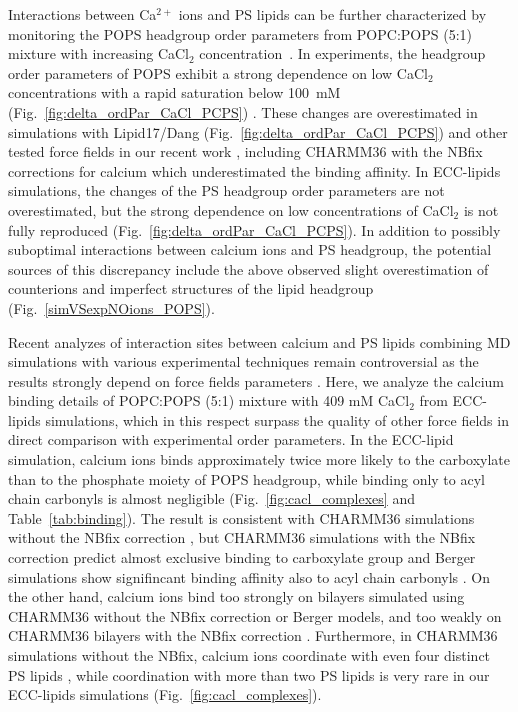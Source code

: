\documentclass[journal=jctcce,manuscript=article]{achemso}
\begin{document}
Interactions between Ca$^{2+}$ ions and PS lipids can be further characterized by monitoring
the POPS headgroup order parameters from POPC:POPS (5:1) mixture with increasing  CaCl$_2$ concentration~\cite{roux90}.
In experiments, the headgroup order parameters of POPS exhibit a strong dependence
on low CaCl$_2$ concentrations with a rapid saturation below 100~mM  (Fig.~\ref{fig:delta_ordPar_CaCl_PCPS}) \cite{roux90}.
These changes are overestimated in simulations with Lipid17/Dang (Fig.~\ref{fig:delta_ordPar_CaCl_PCPS})
and other tested force fields in our recent work \cite{NMRlipidsIV}, 
including CHARMM36 with the NBfix corrections for calcium
which underestimated the binding affinity.
In ECC-lipids simulations, the changes of the PS headgroup order parameters are not overestimated,
but the strong dependence on low concentrations of CaCl$_2$ is not fully reproduced (Fig.~\ref{fig:delta_ordPar_CaCl_PCPS}).
In addition to possibly suboptimal interactions between calcium ions and PS headgroup, the potential sources of this
discrepancy include the above observed slight overestimation of  counterions and
imperfect structures of the lipid headgroup (Fig.~\ref{simVSexpNOions_POPS}).

Recent analyzes of interaction sites between calcium and PS lipids combining
MD simulations with various experimental techniques remain controversial 
as the results strongly depend on force fields parameters \cite{melcrova16,valentine18,hallock18, NMRlipidsIV}.
Here, we analyze the calcium binding details of POPC:POPS (5:1) mixture with 409 mM CaCl$_2$ from ECC-lipids simulations,
which in this respect surpass the quality of other force fields in direct comparison with experimental order parameters.
In the ECC-lipid simulation, calcium ions binds approximately twice more likely 
to the carboxylate than to the phosphate moiety of POPS headgroup,
while binding only to acyl chain carbonyls is almost negligible (Fig.~\ref{fig:cacl_complexes} and Table~\ref{tab:binding}).
The result is consistent with CHARMM36 simulations without the NBfix correction \cite{hallock18},
but CHARMM36 simulations with the NBfix correction \cite{kim16} predict almost exclusive binding to carboxylate group \cite{valentine18}
and Berger simulations show signifincant binding affinity also to acyl chain carbonyls \cite{melcrova16}.
On the other hand, calcium ions bind too strongly on bilayers simulated using CHARMM36 without the NBfix correction
or Berger models, and too weakly on CHARMM36 bilayers with the NBfix correction \cite{catte16,NMRlipidsIV}.
Furthermore, in CHARMM36 simulations without the NBfix,
calcium ions coordinate with even four distinct PS lipids \cite{hallock18}, while coordination with more than two PS lipids
is very rare in our ECC-lipids simulations (Fig.~\ref{fig:cacl_complexes}).
\end{document}
